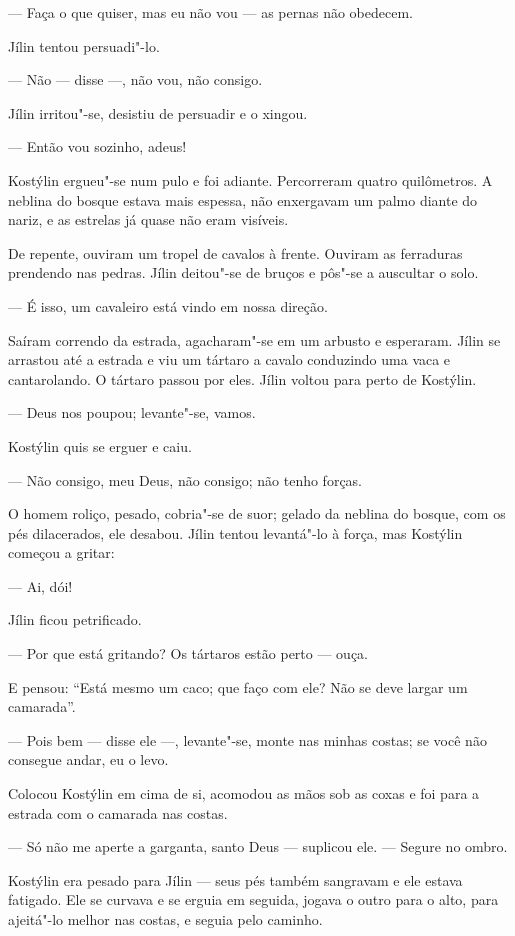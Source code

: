 --- Faça o que quiser, mas eu não vou --- as pernas não obedecem.

Jílin tentou persuadi"-lo.

--- Não --- disse ---, não vou, não consigo.

Jílin irritou"-se, desistiu de persuadir e o xingou.

--- Então vou sozinho, adeus!

Kostýlin ergueu"-se num pulo e foi adiante. Percorreram quatro
quilômetros. A neblina do bosque estava mais espessa, não enxergavam um
palmo diante do nariz, e as estrelas já quase não eram visíveis.

De repente, ouviram um tropel de cavalos à frente. Ouviram as ferraduras
prendendo nas pedras. Jílin deitou"-se de bruços e pôs"-se a auscultar o
solo.

--- É isso, um cavaleiro está vindo em nossa direção.

Saíram correndo da estrada, agacharam"-se em um arbusto e esperaram.
Jílin se arrastou até a estrada e viu um tártaro a cavalo conduzindo uma
vaca e cantarolando. O tártaro passou por eles. Jílin voltou para perto
de Kostýlin.

--- Deus nos poupou; levante"-se, vamos.

Kostýlin quis se erguer e caiu.

--- Não consigo, meu Deus, não consigo; não tenho forças.

O homem roliço, pesado, cobria"-se de suor; gelado da neblina do bosque,
com os pés dilacerados, ele desabou. Jílin tentou levantá"-lo à força,
mas Kostýlin começou a gritar:

--- Ai, dói!

Jílin ficou petrificado.

--- Por que está gritando? Os tártaros estão perto --- ouça.

E pensou: ``Está mesmo um caco; que faço com ele? Não se deve largar um
camarada''.

--- Pois bem --- disse ele ---, levante"-se, monte nas minhas costas; se
você não consegue andar, eu o levo.

Colocou Kostýlin em cima de si, acomodou as mãos sob as coxas e foi para
a estrada com o camarada nas costas.

--- Só não me aperte a garganta, santo Deus --- suplicou ele. --- Segure
no ombro.

Kostýlin era pesado para Jílin --- seus pés também sangravam e ele
estava fatigado. Ele se curvava e se erguia em seguida, jogava o outro
para o alto, para ajeitá"-lo melhor nas costas, e seguia pelo caminho.

